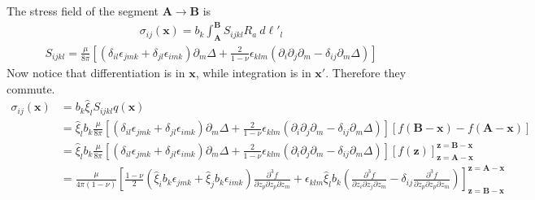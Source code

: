 The stress field of the segment $\bm A\rightarrow\bm B$ is
\begin{align}
\sigma_{ij}(\bm x)=b_k\int_{\bm A}^{\bm B}S_{ijkl}R_a\ d\ell'_l
\end{align}
\begin{align}
S_{ijkl}=\frac{\mu}{8\pi}\left[\left(\delta_{il}\epsilon_{jmk}+\delta_{jl}\epsilon_{imk}\right)\partial_m\Delta+\frac{2}{1-\nu}\epsilon_{klm}\left(\partial_{i}\partial_j\partial_m-\delta_{ij}\partial_m\Delta\right)\right]
\end{align}
Now notice that differentiation is in $\bm x$, while integration is in $\bm x'$. Therefore they commute. 
\begin{align}
\sigma_{ij}(\bm x)
&=b_k\hat{\xi}_lS_{ijkl}q(\bm x)\nonumber\\
&=\hat{\xi}_lb_k\frac{\mu}{8\pi}\left[\left(\delta_{il}\epsilon_{jmk}+\delta_{jl}\epsilon_{imk}\right)\partial_m\Delta+\frac{2}{1-\nu}\epsilon_{klm}\left(\partial_{i}\partial_j\partial_m-\delta_{ij}\partial_m\Delta\right)\right]\left[f(\bm B-\bm x)-f(\bm A-\bm x)\right]\nonumber\\
&=\hat{\xi}_lb_k\frac{\mu}{8\pi}\left[\left(\delta_{il}\epsilon_{jmk}+\delta_{jl}\epsilon_{imk}\right)\partial_m\Delta+\frac{2}{1-\nu}\epsilon_{klm}\left(\partial_{i}\partial_j\partial_m-\delta_{ij}\partial_m\Delta\right)\right]\left[f(\bm z)\right]^{\bm z=\bm B-\bm x}_{\bm z=\bm A-\bm x}\nonumber\\
&=\frac{\mu}{4\pi(1-\nu)}\left[\frac{1-\nu}{2}\left(\hat{\xi}_ib_k\epsilon_{jmk}+\hat{\xi}_jb_k\epsilon_{imk}\right)\frac{\partial^3 f}{\partial z_p\partial z_p\partial z_m}+\epsilon_{klm}\hat{\xi}_lb_k\left(\frac{\partial^3 f}{\partial z_i\partial z_j\partial z_m}-\delta_{ij}\frac{\partial^3 f}{\partial z_p\partial z_p\partial z_m}\right)\right]^{\bm z=\bm A-\bm x}_{\bm z=\bm B-\bm x}
\label{stressStraightDerivation}
\end{align}
 

